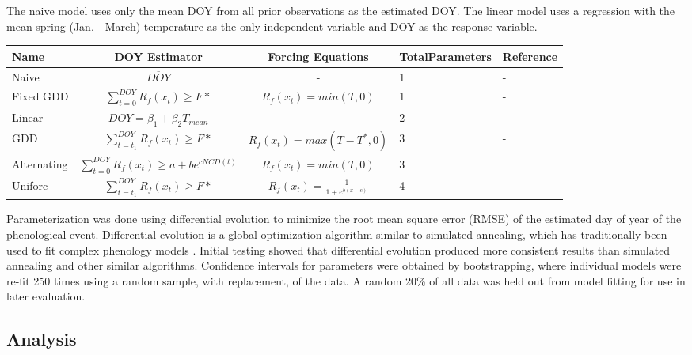 \documentclass[fleqn,10pt,lineno]{wlpeerj} %
\begin{document}
The naive model uses only the mean DOY from all prior observations as the estimated DOY. The linear model uses a regression with the mean spring (Jan. - March) temperature as the only independent variable and DOY as the response variable. 

\begin{center}
{\def\arraystretch{2}\tabcolsep=5pt
    \begin{tabular}{ | l | c | c | p{1.3cm} | l |}
    \hline
    Name & DOY Estimator & Forcing Equations & Total\newline Parameters & Reference \\ \hline
    Naive & \( \overline{DOY} \) & - & 1 & - \\
    Fixed GDD &$\sum_{t=0}^{DOY}R_{f}(x_{t})\geq F* $  & $R_{f}(x_{t}) = min(T, 0)$ & 1 & - \\
    Linear & \( DOY = \beta_{1} + \beta_{2}T_{mean} \) & - & 2 & - \\
    GDD & $\sum_{t=t_{1}}^{DOY}R_{f}(x_{t})\geq F* $ & $ R_{f}(x_{t}) = max(T - T^{*}, 0) $  & 3 & - \\
    Alternating & $\sum_{t=0}^{DOY}R_{f}(x_{t})\geq a + be^{cNCD(t)} $ & $R_{f}(x_{t}) = min(T, 0) $ & 3 & \citep{cannell1983} \\
    Uniforc &  $\sum_{t=t_{1}}^{DOY}R_{f}(x_{t})\geq F* $ & $ R_{f}(x_{t}) = \frac{1}{1 + e^{b(x-c)}} $ & 4 & \citep{chuine2000} \\

    \hline
    \end{tabular}
    }
\end{center}

Parameterization was done using differential evolution to minimize the root mean square error (RMSE) of the estimated day of year of the phenological event. Differential evolution is a global optimization algorithm similar to simulated annealing, which has traditionally been used to fit complex phenology models \citep{storn1997, chuine2000}. Initial testing showed that differential evolution produced more consistent results than simulated annealing and other similar algorithms. Confidence intervals for parameters were obtained by bootstrapping, where individual models were re-fit 250 times using a random sample, with replacement, of the data. A random 20\% of all data was held out from model fitting for use in later evaluation. 


\subsection*{Analysis}
\end{document}
